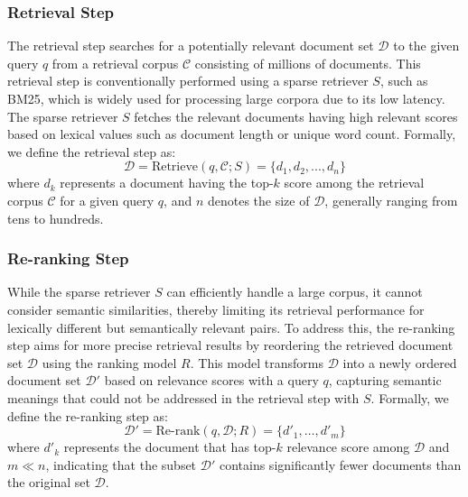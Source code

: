 \subsubsection{Retrieval Step}
\label{Retrieval Step}
The retrieval step searches for a potentially relevant document set $\mathcal{D}$ to the given query $q$ from a retrieval corpus $\mathcal{C}$ consisting of millions of documents. 
This retrieval step is conventionally performed using a sparse retriever $S$, such as BM25, which is widely used for processing large corpora due to its low latency. 
The sparse retriever $S$ fetches the relevant documents having high relevant scores based on lexical values such as document length or unique word count.
Formally, we define the retrieval step as:
\[
\mathcal{D} = \text{Retrieve}(q, \mathcal{C}; S) = \{d_1, d_2, ..., d_n\}
\]
where $d_k$ represents a document having the top-$k$ score among the retrieval corpus $\mathcal{C}$ for a given query $q$, and $n$ denotes the size of $\mathcal{D}$, generally ranging from tens to hundreds.

\subsubsection{Re-ranking Step}\label{Re-ranking step}

While the sparse retriever $S$ can efficiently handle a large corpus, it cannot consider semantic similarities, thereby limiting its retrieval performance for lexically different but semantically relevant pairs. 
To address this, the re-ranking step aims for more precise retrieval results by reordering the retrieved document set $\mathcal{D}$ using the ranking model $R$. 
This model transforms $\mathcal{D}$ into a newly ordered document set $\mathcal{D'}$ based on relevance scores with a query $q$, capturing semantic meanings that could not be addressed in the retrieval step with $S$.
Formally, we define the re-ranking step as:
\[
\mathcal{D'}=\text{Re-rank}(q,\mathcal{D};R)=\{d'_1,\ldots,d'_m\}
\]
where $d'_k$ represents the document that has top-$k$ relevance score among $\mathcal{D}$ and \(m \ll n\), indicating that the subset $\mathcal{D'}$ contains significantly fewer documents than the original set $\mathcal{D}$.



